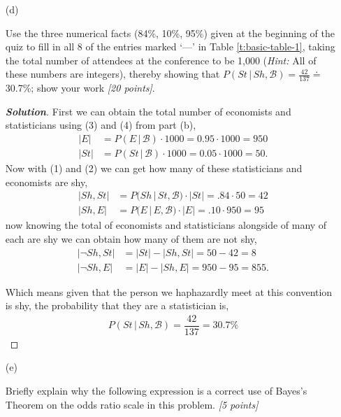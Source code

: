 \documentclass[12pt]{article}
\newcommand{\given}{\, | \,}
\newenvironment{solution}{\begin{proof}[\textbf{\textit{Solution}}] }{\end{proof}}
\begin{document}
\begin{itemize}

\item[(d)]

Use the three numerical facts (84\%, 10\%, 95\%) given at the beginning of the quiz to fill in all 8 of the entries marked `---' in Table \ref{t:basic-table-1}, taking the total number of attendees at the conference to be 1,000 (\textit{Hint:} All of these numbers are integers), thereby showing that $P ( St \given Sh, \mathcal{ B } ) = \frac{ 42 }{ 137 } \doteq$ 30.7\%; show your work \textit{[20 points]}.

\begin{solution}
    First we can obtain the total number of economists and statisticians using (3) and (4) from part (b),
    \begin{align*}
        |E| &= P(E \given \mathcal{B}) \cdot 1000 = 0.95 \cdot 1000 = 950 \\
        |St| &= P(St \given \mathcal{B}) \cdot 1000 = 0.05 \cdot 1000 = 50.
    \end{align*}
    Now with (1) and (2) we can get how many of these statisticians and economists are shy,
    \begin{align*}
        |Sh, St| &= P(Sh \given St, \mathcal{B}) \cdot |St| = .84 \cdot 50 = 42 \\
        |Sh, E| &= P(E \given E, \mathcal{B}) \cdot |E| = .10 \cdot 950 = 95
    \end{align*}
    now knowing the total of economists and statisticians alongside of many of each are shy we can obtain how many of them are not shy,
    \begin{align*}
        |\neg Sh, St| &= |St| - |Sh, St| = 50 - 42 = 8 \\
        |\neg Sh, E| &= |E| - |Sh, E| =  950 - 95  = 855.
    \end{align*}

    Which means given that the person we haphazardly meet at this convention is shy, the probability that they are a statistician is,
    \begin{align*}
        P( St \given Sh, \mathcal{B}) = \dfrac{42}{137} = 30.7\%
    \end{align*}
\end{solution}

\newpage

\item[(e)]

Briefly explain why the following expression is a correct use of Bayes's Theorem on the odds ratio scale in this problem. \textit{[5 points]} \vspace*{-0.1in}


\end{itemize}
\end{document}
